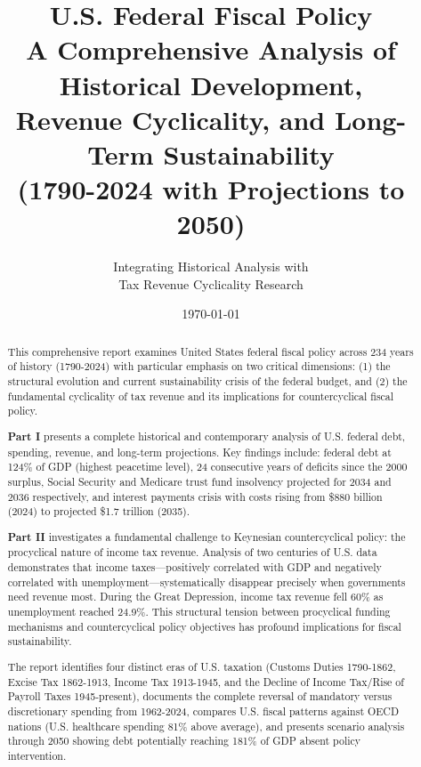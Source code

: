 \documentclass[12pt,letterpaper]{article}
\title{\textbf{\Huge U.S. Federal Fiscal Policy}\\[0.5cm]
       \LARGE A Comprehensive Analysis of Historical Development,\\
       Revenue Cyclicality, and Long-Term Sustainability\\[0.5cm]
       \large (1790-2024 with Projections to 2050)}
\author{Integrating Historical Analysis with\\
        Tax Revenue Cyclicality Research}
\date{\today}
\begin{document}
\maketitle
\thispagestyle{empty}

\begin{abstract}
\noindent This comprehensive report examines United States federal fiscal policy across 234 years of history (1790-2024) with particular emphasis on two critical dimensions: (1) the structural evolution and current sustainability crisis of the federal budget, and (2) the fundamental cyclicality of tax revenue and its implications for countercyclical fiscal policy.

\vspace{0.3cm}

\noindent \textbf{Part I} presents a complete historical and contemporary analysis of U.S. federal debt, spending, revenue, and long-term projections. Key findings include: federal debt at 124\% of GDP (highest peacetime level), 24 consecutive years of deficits since the 2000 surplus, Social Security and Medicare trust fund insolvency projected for 2034 and 2036 respectively, and interest payments crisis with costs rising from \$880 billion (2024) to projected \$1.7 trillion (2035).

\vspace{0.3cm}

\noindent \textbf{Part II} investigates a fundamental challenge to Keynesian countercyclical policy: the procyclical nature of income tax revenue. Analysis of two centuries of U.S. data demonstrates that income taxes—positively correlated with GDP and negatively correlated with unemployment—systematically disappear precisely when governments need revenue most. During the Great Depression, income tax revenue fell 60\% as unemployment reached 24.9\%. This structural tension between procyclical funding mechanisms and countercyclical policy objectives has profound implications for fiscal sustainability.

\vspace{0.3cm}

\noindent The report identifies four distinct eras of U.S. taxation (Customs Duties 1790-1862, Excise Tax 1862-1913, Income Tax 1913-1945, and the Decline of Income Tax/Rise of Payroll Taxes 1945-present), documents the complete reversal of mandatory versus discretionary spending from 1962-2024, compares U.S. fiscal patterns against OECD nations (U.S. healthcare spending 81\% above average), and presents scenario analysis through 2050 showing debt potentially reaching 181\% of GDP absent policy intervention.
\end{abstract}
\end{document}
